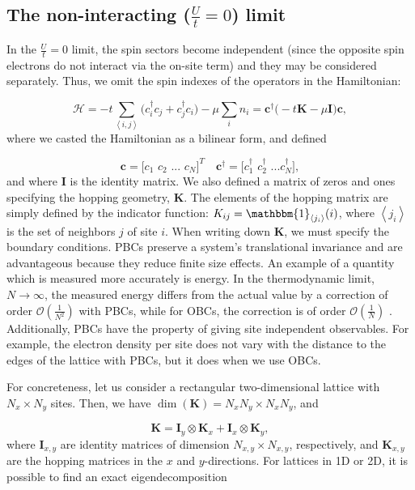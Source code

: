 \subsection{The non-interacting ($\frac{U}{t} = 0$) limit}

In the $\frac{U}{t} = 0$ limit, the spin sectors become independent (since the opposite spin electrons do not interact via the on-site term) and they may be considered separately.
Thus, we omit the spin indexes of the operators in the Hamiltonian:

\begin{equation}
\mathcal{H} = -t \sum_{\left\langle i, j \right\rangle} \bigg( c_i^\dagger c_j + c_j^\dagger c_i \bigg) - \mu \sum_i n_i = \bm c^\dagger \bigg( -t \bm K - \mu \bm I \bigg) \bm c ,
\end{equation}
where we casted the Hamiltonian as a bilinear form, and defined

\begin{equation}
\bm c = \bigg[ c_1 \,\, c_2 \,\, ... \,\, c_N \bigg]^T \quad \bm c^\dagger = \bigg[c_1^\dagger \,\, c_2^\dagger \,\, ... c_N^\dagger \bigg] ,
\end{equation}
and where $\bm I$ is the identity matrix.
We also defined a matrix of zeros and ones specifying the hopping geometry, $\bm K$. The elements of the hopping matrix are simply defined by the indicator function: $K_{ij} = \mathbbm{1}_{\left\langle j_i \right\rangle} (i)$, where $\left\langle j_i \right\rangle$ is the set of neighbors $j$ of site $i$.
When writing down $\bm K$, we must specify the boundary conditions.
\acp{PBC} preserve a system's translational invariance and are advantageous because they reduce finite size effects.
An example of a quantity which is measured more accurately is energy.
In the thermodynamic limit, $N \rightarrow \infty$, the measured energy differs from the actual value by a correction of order $\mathcal{O}(\frac{1}{N^2})$ with \acp{PBC}, while for \acp{OBC}, the correction is of order $\mathcal{O}(\frac{1}{N})$ \cite{hou_numerical_2009}.
Additionally, \acp{PBC} have the property of giving site independent observables.
For example, the electron density per site does not vary with the distance to the edges of the lattice with \acp{PBC}, but it does when we use \acp{OBC}.

For concreteness, let us consider a rectangular two-dimensional lattice with $N_x \times N_y$ sites. Then, we have $\dim(\bm K) = N_x N_y \times N_x N_y $, and

\begin{equation}
\bm K = \bm I_y \otimes \bm K_x + \bm I_x \otimes \bm K_y ,
\end{equation}
where $\bm I_{x, y}$ are identity matrices of dimension $N_{x, y} \times N_{x, y}$, respectively, and $\bm K_{x, y}$ are the hopping matrices in the $x$ and $y$-directions.
For lattices in \acs{1D} or \acs{2D}, it is possible to find an exact eigendecomposition

